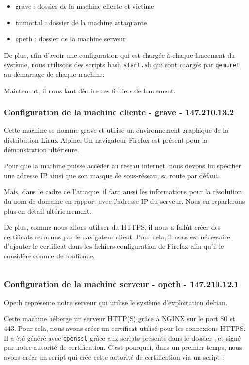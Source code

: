 \begin{itemize}
\item grave : dossier de la machine cliente et victime
\item immortal : dossier de la machine attaquante
\item opeth : dossier de la machine serveur
\end{itemize}

De plus, afin d'avoir une configuration qui est chargée à chaque lancement du système, nous utilisons des scripts bash \verb+start.sh+ qui sont chargés par \verb+qemunet+ au démarrage de chaque machine.

Maintenant, il nous faut décrire ces fichiers de lancement.

\subsubsection{Configuration de la machine cliente - grave - 147.210.13.2}
Cette machine se nomme grave et utilise un environnement graphique de la distribution Linux Alpine. Un navigateur Firefox est présent pour la démonstration ultérieure.

Pour que la machine puisse accéder au réseau internet, nous devons lui spécifier une adresse IP ainsi que son masque de sous-réseau, sa route par défaut.

Mais, dans le cadre de l'attaque, il faut aussi les informations pour la résolution du nom de domaine en rapport avec l'adresse IP du serveur. Nous en reparlerons plus en détail ultérieurement.

De plus, comme nous allons utiliser du HTTPS, il nous a fallût créer des certificats reconnus par le navigateur client. Pour cela, il nous est nécessaire d'ajouter le certificat dans les fichiers configuration de Firefox afin qu'il le considère comme de confiance.

\inputminted[bgcolor=lbcolor, breaklines]{shell}{../sslstrip2/grave/start.sh}

\subsubsection{Configuration de la machine serveur - opeth - 147.210.12.1}

Opeth représente notre serveur qui utilise le système d'exploitation debian.

Cette machine héberge un serveur HTTP(S) grâce à NGINX sur le port 80 et 443. Pour cela, nous avons créer un certificat utilisé pour les connexions HTTPS. Il a été généré avec \verb+openssl+ grâce aux scripts présents dans le dossier , et signé par notre autorité de certification. C'est pourquoi, dans un premier temps, nous avons créer un script qui crée cette autorité de certification via un script :

